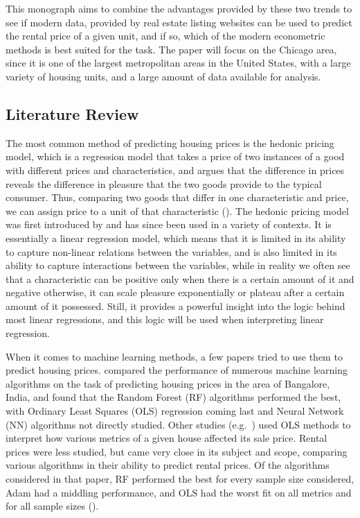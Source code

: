 \documentclass[12pt]{report}
\begin{document}
This monograph aims to combine the advantages provided by these two trends to see if modern data, provided by real estate listing websites can be used to predict the rental price of a given unit, and if so, which of the modern econometric methods is best suited for the task. The paper will focus on the Chicago area, since it is one of the largest metropolitan areas in the United States, with a large variety of housing units, and a large amount of data available for analysis.

\subsection{Literature Review}

The most common method of predicting housing prices is the hedonic pricing model, which is a regression model that takes a price of two instances of a good with different prices and characteristics, and argues that the difference in prices reveals the difference in pleasure that the two goods provide to the typical consumer. Thus, comparing two goods that differ in one characteristic and price, we can assign price to a unit of that characteristic (\cite{taylor2003}). The hedonic pricing model was first introduced by \textcite{rosen1974} and has since been used in a variety of contexts.  It is essentially a linear regression model, which means that it is limited in its ability to capture non-linear relations between the variables, and is also limited in its ability to capture interactions between the variables, while in reality we often see that a characteristic can be positive only when there is a certain amount of it and negative otherwise, it can scale pleasure exponentially or plateau after a certain amount of it possessed. Still, it provides a powerful insight into the logic behind most linear regressions, and this logic will be used when interpreting linear regression.

When it comes to machine learning methods, a few papers tried to use them to predict housing prices.\@ \textcite{joshi2022} compared the performance of numerous machine learning algorithms on the task of predicting housing prices in the area of Bangalore, India, and found that the Random Forest (RF) algorithms performed the best, with Ordinary Least Squares (OLS) regression coming last and Neural Network (NN) algorithms not directly studied. Other studies (e.g.\ \textcite{zietz2008}) used OLS methods to interpret how various metrics of a given house affected its sale price. Rental prices were less studied, but \textcite{yoshida2022} came very close in its subject and scope, comparing various algorithms in their ability to predict rental prices. Of the algorithms considered in that paper, RF performed the best for every sample size considered, Adam had a middling performance, and OLS had the worst fit on all metrics and for all sample sizes (\cite[p. 19]{yoshida2022}).
\end{document}
